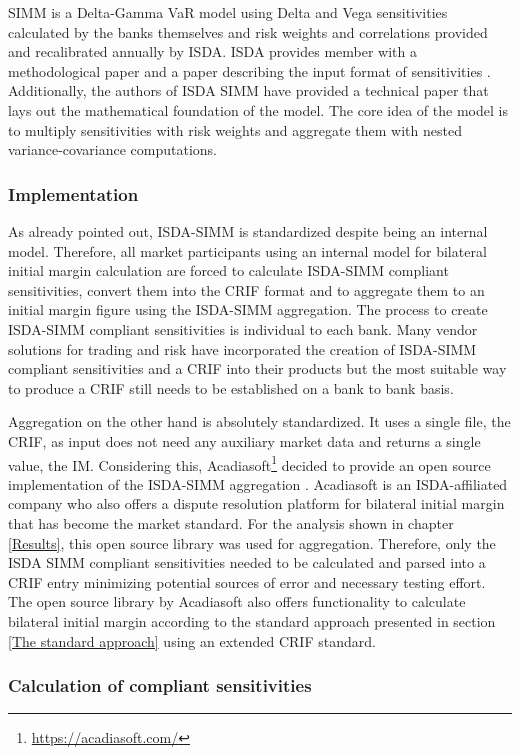 \documentclass[../Thesis_AHoecherl.tex]{subfiles}
\begin{document}
    SIMM is a Delta-Gamma VaR model using Delta and Vega sensitivities calculated by the banks themselves and risk weights and correlations provided and recalibrated annually by ISDA. ISDA provides member with a methodological paper \cite{SIMM} and a paper describing the input format of sensitivities \cite{RiskDataStandard}.
    Additionally, the authors of ISDA SIMM have provided a technical paper \cite{SIMM_technical_paper} that lays out the mathematical foundation of the model. 
    The core idea of the model is to multiply sensitivities with risk weights and aggregate them with nested variance-covariance computations.

    \subsubsection{Implementation}\label{sec:ISDA SIMM implementation}
    As already pointed out, ISDA-SIMM is standardized despite being an internal model. Therefore, all market participants using an internal model for bilateral initial margin calculation are forced to calculate ISDA-SIMM compliant sensitivities, convert them into the CRIF format and to aggregate them to an initial margin figure using the ISDA-SIMM aggregation.
    The process to create ISDA-SIMM compliant sensitivities is individual to each bank. Many vendor solutions for trading and risk have incorporated the creation of ISDA-SIMM compliant sensitivities and a CRIF into their products but the most suitable way to produce a CRIF still needs to be established on a bank to bank basis.
    
    Aggregation on the other hand is absolutely standardized. It uses a single file, the \gls{CRIF}, as input does not need any auxiliary market data and returns a single value, the IM. 
    Considering this, Acadiasoft\footnote{\url{https://acadiasoft.com/}} decided to provide an open source implementation of the ISDA-SIMM aggregation \cite{simm-lib}. Acadiasoft is an ISDA-affiliated company who also offers a dispute resolution platform for bilateral initial margin that has become the market standard.
    For the analysis shown in chapter \ref{Results}, this open source library was used for aggregation. 
    Therefore, only the ISDA SIMM compliant sensitivities needed to be calculated and parsed into a CRIF entry minimizing potential sources of error and necessary testing effort. The open source library by Acadiasoft also offers functionality to calculate bilateral initial margin according to the standard approach presented in section \ref{The standard approach} using an extended \gls{CRIF} standard.

    \subsubsection{Calculation of compliant sensitivities}\label{Calculation of ISDA SIMM compliant sensitivities}
\end{document}
